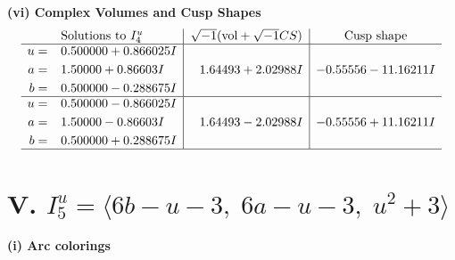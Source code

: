 \documentclass[1p]{elsarticle_modified}
\theoremstyle{definition}
\newcommand{\I}{\sqrt{-1}}
\begin{document}
\newpage\flushleft \textbf{(vi) Complex Volumes and Cusp Shapes}
$$\begin{array}{c|c|c}  
\text{Solutions to }I^u_{4}& \I (\text{vol} + \sqrt{-1}CS) & \text{Cusp shape}\\
 \hline 
\begin{aligned}
u &= \phantom{-}0.500000 + 0.866025 I \\
a &= \phantom{-}1.50000 + 0.86603 I \\
b &= \phantom{-}0.500000 - 0.288675 I\end{aligned}
 & \phantom{-}1.64493 + 2.02988 I & -0.55556 - 11.16211 I \\ \hline\begin{aligned}
u &= \phantom{-}0.500000 - 0.866025 I \\
a &= \phantom{-}1.50000 - 0.86603 I \\
b &= \phantom{-}0.500000 + 0.288675 I\end{aligned}
 & \phantom{-}1.64493 - 2.02988 I & -0.55556 + 11.16211 I\\
 \hline 
 \end{array}$$\newpage\newpage\renewcommand{\arraystretch}{1}
\centering \section*{V. $I^u_{5}= \langle 6 b- u-3,\;6 a- u-3,\;u^2+3 \rangle$}
\flushleft \textbf{(i) Arc colorings}\\
\end{document}
